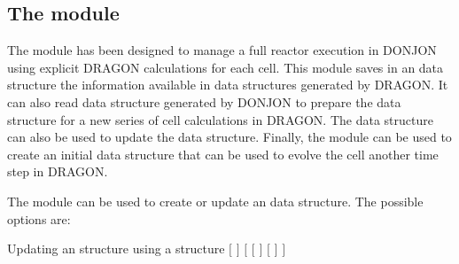 \subsection{The  module}\label{sect:HSTData}

The  module has been designed to manage a full reactor execution in DONJON using explicit DRAGON calculations for each
cell.\cite{hst} This module saves in an  data structure the information available in  data
structures generated by DRAGON. It can also read  data structure generated by DONJON to prepare the  data structure for a
new series of cell calculations in DRAGON. The  data structure  can also be used to update the  data structure. Finally, the module
 can be used to create an initial  data structure that can be used to evolve the cell another time step in DRAGON. 

The  module can be used to create or update an  data structure. The possible options are:

\begin{DataStructure}{Updating an  structure using a  structure}
  \moc{:=}  $[$  $]$   $[$ \moc{::} 
$[$  $]$  $[$   $]$    $]$ 
\end{DataStructure}

